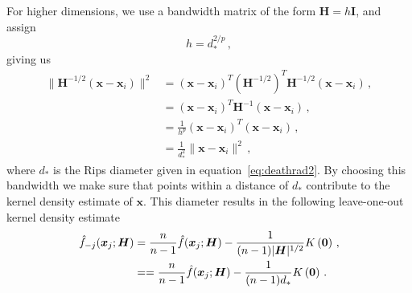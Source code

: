 \documentclass[letter,12pt]{article}
\newcommand{\argmax}{\mathop{\text{argmax}}}
\begin{document}

For higher dimensions, we use a bandwidth matrix of the form $\bm{H} = h\bm{I}$, and assign
\begin{equation}\label{eq:bandwidth}
    h = d_*^{2/p} \, , 
\end{equation}
giving us 
\begin{align}\label{eq:kde11}
    \| \bm{H}^{-1/2}(\bm{x} - \bm{x}_i) \|^2  & = (\bm{x} - \bm{x}_i)^T \left(\bm{H}^{-1/2}\right)^T \bm{H}^{-1/2} (\bm{x} - \bm{x}_i) \, , \\
     & = (\bm{x} - \bm{x}_i)^T \bm{H}^{-1} (\bm{x} - \bm{x}_i) \, ,  \\
     & = \frac{1}{h^p}(\bm{x} - \bm{x}_i)^T  (\bm{x} - \bm{x}_i)\, , \\
     & = \frac{1}{d_*^2}\|\bm{x} - \bm{x}_i \|^2 \, , 
\end{align}
where $d_*$ is the Rips diameter given in equation~\eqref{eq:deathrad2}. By choosing this bandwidth we make sure that points within a distance of $d_*$ contribute to the kernel density estimate of $\bm{x}$. This diameter results in the following leave-one-out kernel density estimate 
\begin{align}\label{eq:kde12}
    \hat{f}_{-j}(\bm{x}_j;\bm{H})  & = \frac{n}{n-1} \hat{f}(\bm{x}_j;\bm{H}) - \frac{1}{(n-1)|\bm{H}|^{1/2}} K\left(\bm{0}\right) \, ,  \notag \\
    & = = \frac{n}{n-1} \hat{f}(\bm{x}_j;\bm{H}) - \frac{1}{(n-1)d_*} K\left(\bm{0}\right) \,  .
\end{align}
\end{document}
